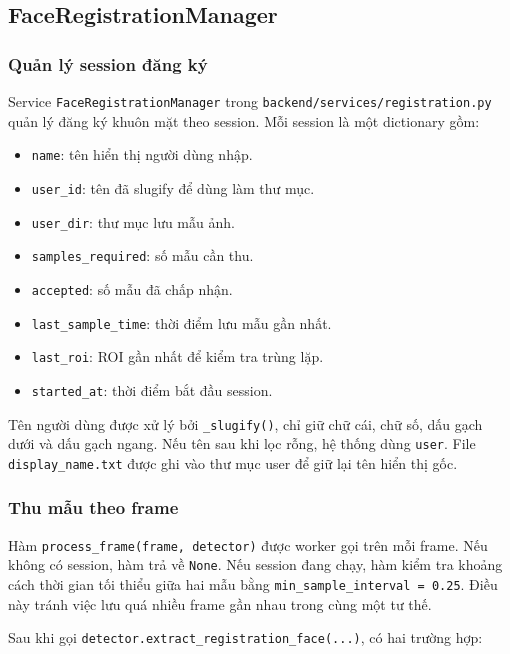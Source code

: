\subsection{FaceRegistrationManager}

\subsubsection{Quản lý session đăng ký}

Service \texttt{FaceRegistrationManager} trong \texttt{backend/services/registration.py} quản lý đăng ký khuôn mặt theo session. Mỗi session là một dictionary gồm:

\begin{itemize}
    \item \texttt{name}: tên hiển thị người dùng nhập.
    \item \texttt{user\_id}: tên đã slugify để dùng làm thư mục.
    \item \texttt{user\_dir}: thư mục lưu mẫu ảnh.
    \item \texttt{samples\_required}: số mẫu cần thu.
    \item \texttt{accepted}: số mẫu đã chấp nhận.
    \item \texttt{last\_sample\_time}: thời điểm lưu mẫu gần nhất.
    \item \texttt{last\_roi}: ROI gần nhất để kiểm tra trùng lặp.
    \item \texttt{started\_at}: thời điểm bắt đầu session.
\end{itemize}

Tên người dùng được xử lý bởi \texttt{\_slugify()}, chỉ giữ chữ cái, chữ số, dấu gạch dưới và dấu gạch ngang. Nếu tên sau khi lọc rỗng, hệ thống dùng \texttt{user}. File \texttt{display\_name.txt} được ghi vào thư mục user để giữ lại tên hiển thị gốc.

\subsubsection{Thu mẫu theo frame}

Hàm \texttt{process\_frame(frame, detector)} được worker gọi trên mỗi frame. Nếu không có session, hàm trả về \texttt{None}. Nếu session đang chạy, hàm kiểm tra khoảng cách thời gian tối thiểu giữa hai mẫu bằng \texttt{min\_sample\_interval = 0.25}. Điều này tránh việc lưu quá nhiều frame gần nhau trong cùng một tư thế.

Sau khi gọi \texttt{detector.extract\_registration\_face(...)}, có hai trường hợp:

